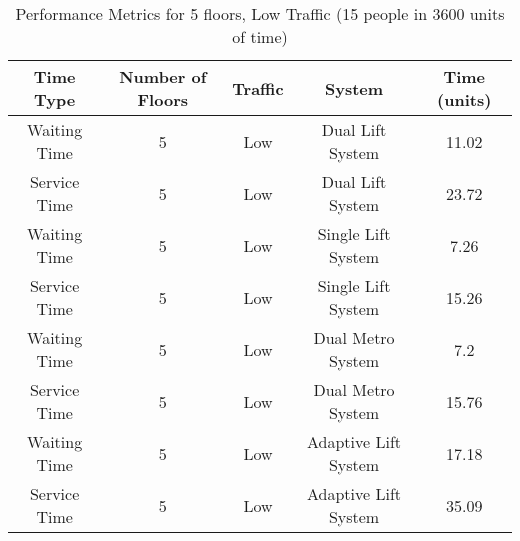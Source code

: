 \documentclass[12pt,a4paper]{report}
\begin{document}
\begin{table}[H]
\centering
\begin{tabular}{|c|c|c|c|c|}
\hline
\textbf{Time Type}    & \textbf{Number of Floors} & \textbf{Traffic} & \textbf{System}     & \textbf{Time (units)} \\ \hline
Waiting Time         & 5                     & Low              & Dual Lift System               & 11.02              \\ \hline
Service Time         & 5                     & Low              & Dual Lift System               & 23.72              \\ \hline
Waiting Time         & 5                     & Low              & Single Lift System             & 7.26               \\ \hline
Service Time         & 5                     & Low              & Single Lift System             & 15.26              \\ \hline
Waiting Time         & 5                     & Low              & Dual Metro System              & 7.2                \\ \hline
Service Time         & 5                     & Low              & Dual Metro System              & 15.76              \\ \hline
Waiting Time         & 5                     & Low         & Adaptive Lift System           & 17.18             \\ \hline
Service Time         & 5                     & Low         & Adaptive Lift System           & 35.09            \\ \hline
\end{tabular}
\caption{Performance Metrics for 5 floors, Low Traffic (15 people in 3600 units of time)}
\end{table}
\end{document}
